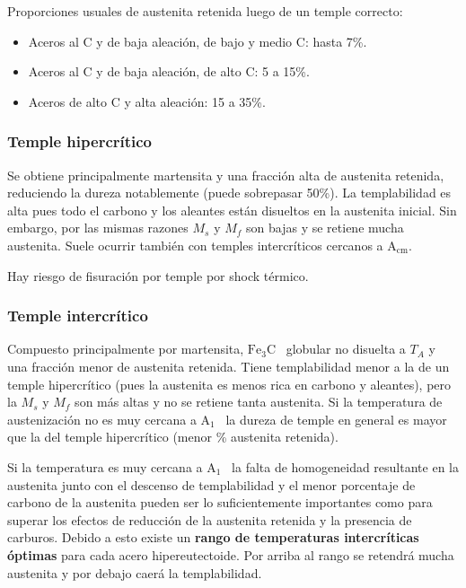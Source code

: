 \documentclass{article}
\newcommand{\Aone}{A\ensuremath{_{1}}}
\newcommand{\Acm}{A\ensuremath{_{\mathrm{cm}}}}
\newcommand{\cementita}{\ensuremath{\mathrm{Fe}_3 \mathrm{C}}}
\begin{document}
Proporciones usuales de austenita retenida luego de un temple correcto: 
\begin{itemize}
    \item Aceros al C y de baja aleación, de bajo y medio C: hasta 7\%.
    \item Aceros al C y de baja aleación, de alto C: 5 a 15\%.
    \item Aceros de alto C y alta aleación: 15 a 35\%.
\end{itemize}


\subsubsection{Temple hipercrítico}
Se obtiene principalmente martensita y una fracción alta de austenita retenida, reduciendo la dureza notablemente (puede sobrepasar 50\%). La templabilidad es alta pues todo el carbono y los aleantes están disueltos en la austenita inicial. Sin embargo, por las mismas razones $M_s$ y $M_f$ son bajas y se retiene mucha austenita. Suele ocurrir también con temples intercríticos cercanos a \Acm{}.

Hay riesgo de fisuración por temple por shock térmico.

\subsubsection{Temple intercrítico}
Compuesto principalmente por martensita, \cementita~ globular no disuelta a $T_A$ y una fracción menor de austenita retenida. Tiene templabilidad menor a la de un temple hipercrítico (pues la austenita es menos rica en carbono y aleantes), pero la $M_s$ y $M_f$ son más altas y no se retiene tanta austenita. Si la temperatura de austenización no es muy cercana a \Aone~ la dureza de temple en general es mayor que la del temple hipercrítico (menor \% austenita retenida). 

Si la temperatura es muy cercana a \Aone~ la falta de homogeneidad resultante en la austenita junto con el descenso de templabilidad y el menor porcentaje de carbono de la austenita pueden ser lo suficientemente importantes como para superar los efectos de reducción de la austenita retenida y la presencia de carburos. Debido a esto existe un \textbf{rango de temperaturas intercríticas óptimas} para cada acero hipereutectoide. Por arriba al rango se retendrá mucha austenita y por debajo caerá la templabilidad.
\end{document}

